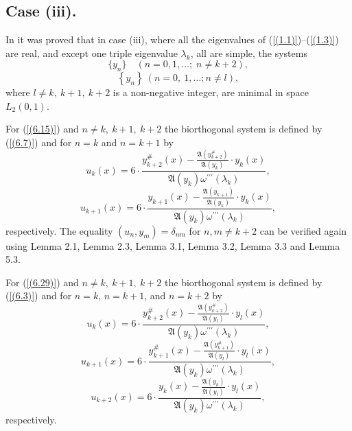 \documentclass[10pt,a4paper]{amsart}
\numberwithin{equation}{section}
\begin{document}
\subsection{Case (iii).}

In \cite{aliyev5} it was proved that in case (iii), where  all the eigenvalues of (\ref{(1.1)})--(\ref{(1.3)}) are real, and except one triple eigenvalue $\lambda_k$, all are simple, the systems
\begin{equation}
  \{ y_n \} \quad (n = 0,1,\ldots;\; n \neq k+2), \label{(6.15)} 
\end{equation}
\begin{equation}
  \left\{ y_{n}\right\}  \ (n=0,\ 1,\ldots ; n \ne l),\label{(6.29)}  
\end{equation}
where $l \ne k,\ k+1,\ k+2$ is a non-negative integer,
are minimal in space $L_2(0,1)$.



For (\ref{(6.15)}) and $n \ne k,\ k+1,\ k+2$ the biorthogonal system is defined by (\ref{(6.7)}) and for 
$n = k$ and $n = k+1$ by
\begin{equation}
u_k(x)=6\cdot\frac{y^{\#}_{k+2}(x)-\frac{\mathfrak{A}(y^{\#}_{k+2})}{\mathfrak{A}(y_k)}\cdot y_k(x)}{ \mathfrak{A}(y_k)\omega^{\prime\prime\prime}(\lambda_k)}
, \label{(6.16)}
\end{equation}
\begin{equation}
u_{k+1}(x)=6\cdot\frac{y_{k+1}(x)-\frac{\mathfrak{A}(y_{k+1})}{\mathfrak{A}(y_k)}\cdot y_k(x)}{ \mathfrak{A}(y_{k})\omega^{\prime\prime\prime}(\lambda_k)}
, \label{(6.17)}
\end{equation}
respectively. The equality $(u_n, y_m) = \delta_{nm}$ for $ n,m\neq k+2$ can be verified again using Lemma 2.1, Lemma 2.3, Lemma 3.1, Lemma 3.2, Lemma 3.3 and Lemma 5.3.

For (\ref{(6.29)}) and $n \ne k,\ k+1,\ k+2$ the biorthogonal system is defined by (\ref{(6.3)}) and for 
$n = k$, $n = k+1$, and $n = k+2$ by
\begin{equation}
u_k(x)=6\cdot\frac{y^{\#}_{k+2}(x)-\frac{\mathfrak{A}(y^{\#}_{k+2})}{\mathfrak{A}(y_l)}\cdot y_l(x)}{ \mathfrak{A}(y_k)\omega^{\prime\prime\prime}(\lambda_k)}
, \label{(6.30)}
\end{equation}
\begin{equation}
u_{k+1}(x)=6\cdot\frac{y^{\#}_{k+1}(x)-\frac{\mathfrak{A}(y^{\#}_{k+1})}{\mathfrak{A}(y_l)}\cdot y_l(x)}{ \mathfrak{A}(y_k)\omega^{\prime\prime\prime}(\lambda_k)}
, \label{(6.31)}
\end{equation}
\begin{equation}
u_{k+2}(x)=6\cdot\frac{y_{k}(x)-\frac{\mathfrak{A}(y_{k})}{\mathfrak{A}(y_l)}\cdot y_l(x)}{ \mathfrak{A}(y_k)\omega^{\prime\prime\prime}(\lambda_k)}
, \label{(6.32)}
\end{equation}
respectively.
\end{document}
